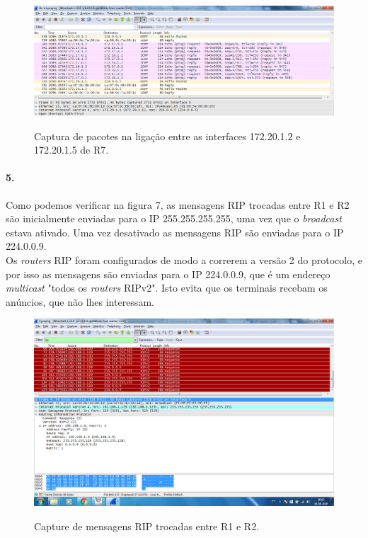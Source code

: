 \begin{figure}[h]
\centering
\includegraphics[width=1\textwidth, height=0.25\textheight]{4b_.png}
\label{fig:captura}
\caption{Captura de pacotes na ligação entre as interfaces 172.20.1.2 e 172.20.1.5 de \textsf{R7}.}
\end{figure}

\paragraph{5.}
Como podemos verificar na figura 7, as mensagens RIP trocadas entre \textsf{R1} e \textsf{R2} são inicialmente enviadas para o IP 255.255.255.255, uma vez que o \emph{broadcast} estava ativado. Uma vez desativado as mensagens RIP são enviadas para o IP 224.0.0.9.\\
Os \emph{routers} RIP foram configurados de modo a correrem a versão 2 do protocolo, e por isso as mensagens são enviadas para o IP 224.0.0.9, que é um endereço \emph{multicast} "todos os \emph{routers} RIPv2".
Isto evita que os terminais recebam os anúncios, que não lhes interessam.

\newpage

\begin{figure}[h]
\centering
\includegraphics[width=1\textwidth, height=0.45\textheight]{5.png}
\label{fig:captura}
\caption{Capture de mensagens RIP trocadas entre \textsf{R1} e \textsf{R2}.}
\end{figure}

